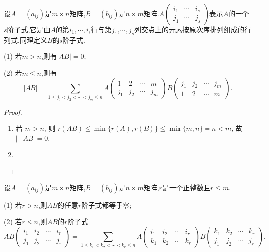\documentclass[lang=cn,newtx,10pt,scheme=chinese]{elegantbook}
\begin{document}
\begin{theorem}\label{theorem:Cauchy-Binet公式}
设\(A=(a_{ij})\)是\(m\times n\)矩阵,\(B=(b_{ij})\)是\(n\times m\)矩阵.\(A\left(\begin{matrix}
i_1 & \cdots & i_s\\
j_1 & \cdots & j_s
\end{matrix}\right)\)表示\(A\)的一个\(s\)阶子式,它是由\(A\)的第\(i_1,\cdots,i_s\)行与第\(j_1,\cdots,j_s\)列交点上的元素按原次序排列组成的行列式.同理定义\(B\)的\(s\)阶子式.

(1) 若\(m > n\),则有\(\vert AB\vert=0\);

(2) 若\(m\leq n\),则有
\[\vert AB\vert=\sum_{1\leq j_1<j_2<\cdots<j_m\leq n}A\left(\begin{matrix}
1 & 2 & \cdots & m\\
j_1 & j_2 & \cdots & j_m
\end{matrix}\right)B\left(\begin{matrix}
j_1 & j_2 & \cdots & j_m\\
1 & 2 & \cdots & m
\end{matrix}\right).\]
\end{theorem}
\begin{proof}
\begin{enumerate}[(1)]
\item 若 \(m > n\), 则 \(r(AB) \leq \min\{r(A), r(B)\} \leq \min\{m, n\} = n < m\), 故 \(|-AB| = 0\).

\item 
\end{enumerate}
\end{proof}

\begin{corollary}\label{corollary:Cauchy-Binet公式推论}
设\(A=(a_{ij})\)是\(m\times n\)矩阵,\(B=(b_{ij})\)是\(n\times m\)矩阵,\(r\)是一个正整数且\(r\leq m\).

(1) 若\(r > n\),则\(AB\)的任意\(r\)阶子式都等于零;

(2) 若\(r\leq n\),则\(AB\)的\(r\)阶子式
\[AB\left(\begin{matrix}
i_1 & i_2 & \cdots & i_r\\
j_1 & j_2 & \cdots & j_r
\end{matrix}\right)=\sum_{1\leq k_1<k_2<\cdots<k_r\leq n}A\left(\begin{matrix}
i_1 & i_2 & \cdots & i_r\\
k_1 & k_2 & \cdots & k_r
\end{matrix}\right)B\left(\begin{matrix}
k_1 & k_2 & \cdots & k_r\\
j_1 & j_2 & \cdots & j_r
\end{matrix}\right).\]
\end{corollary}
\end{document}
